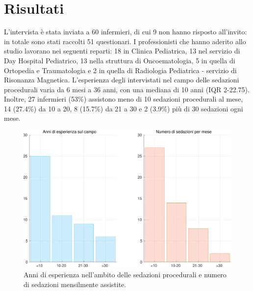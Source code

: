 \chapter{Risultati}

L'intervista è stata inviata a 60 infermieri, di cui 9 non hanno risposto all'invito: in totale sono stati raccolti 51 questionari. I professionisti che hanno aderito allo studio lavorano nei seguenti reparti: 18 in Clinica Pediatrica, 13 nel servizio di Day Hospital Pediatrico, 13 nella struttura di Oncoematologia, 5 in quella di Ortopedia e Traumatologia e 2 in quella di Radiologia Pediatrica - servizio di Risonanza Magnetica. L'esperienza degli intervistati nel campo delle sedazioni procedurali varia da 6 mesi a 36 anni, con una mediana di 10 anni (IQR 2-22.75). Inoltre, 27 infermieri (53$\%$) assistono meno di 10 sedazioni procedurali al mese, 14 (27.4$\%$) da 10 a 20, 8 (15.7$\%$) da 21 a 30 e 2 (3.9$\%$) più di 30 sedazioni ogni mese. 

\begin{figure}[h]
    \centering
    \includegraphics[width=1\textwidth]{Figure/esperienzaVSfrequenza.pdf}
    \caption{Anni di esperienza nell'ambito delle sedazioni procedurali e numero di sedazioni mensilmente assistite.}
    \label{fig:esperienzavsfrequenza}
\end{figure}

\newpage
